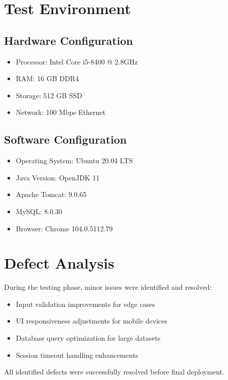 \section{Test Environment}

\subsection{Hardware Configuration}
\begin{itemize}
    \item Processor: Intel Core i5-8400 @ 2.8GHz
    \item RAM: 16 GB DDR4
    \item Storage: 512 GB SSD
    \item Network: 100 Mbps Ethernet
\end{itemize}

\subsection{Software Configuration}
\begin{itemize}
    \item Operating System: Ubuntu 20.04 LTS
    \item Java Version: OpenJDK 11
    \item Apache Tomcat: 9.0.65
    \item MySQL: 8.0.30
    \item Browser: Chrome 104.0.5112.79
\end{itemize}

\section{Defect Analysis}

During the testing phase, minor issues were identified and resolved:
\begin{itemize}
    \item Input validation improvements for edge cases
    \item UI responsiveness adjustments for mobile devices
    \item Database query optimization for large datasets
    \item Session timeout handling enhancements
\end{itemize}

All identified defects were successfully resolved before final deployment.